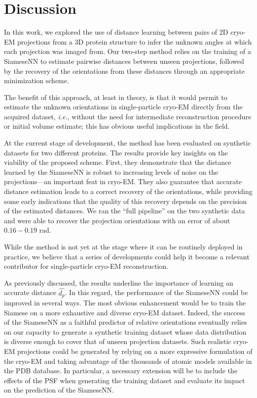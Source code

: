 \section{Discussion}
\label{sec:discussion}

 In this work, we explored the use of distance learning between pairs of 2D cryo-EM projections from a 3D protein structure to infer the unknown angles at which each projection was imaged from. Our two-step method relies on the training of a SiameseNN to estimate pairwise distances between unseen projections, followed by the recovery of the orientations from these distances through an appropriate minimization scheme. 

 The benefit of this approach, at least in theory, is that it would permit to estimate the unknown orientations in single-particle cryo-EM directly from the acquired dataset, \textit{i.e.}, without the need for intermediate reconstruction procedure or initial volume estimate; this has obvious useful implications in the field.  

 At the current stage of development, the method has been evaluated on synthetic datasets for two different proteins. The results provide key insights on the viability of the proposed scheme. First, they demonstrate that the distance learned by the SiameseNN is robust to increasing levels of noise on the projections---an important feat in cryo-EM. They also guarantee that accurate distance estimation leads to a correct recovery of the orientations, while providing some early indications that the quality of this recovery depends on the precision of the estimated distances. We ran the ``full pipeline'' on the two synthetic data and were able to recover the projection orientations with an error of about $0.16-0.19$ rad. 

 While the method is not yet at the stage where it can be routinely deployed in practice, we believe that a series of developments could help it become a relevant contributor for single-particle cryo-EM reconstruction. 

As previously discussed, the results underline the importance of learning an accurate distance $\widehat{d_p}$. In this regard, the performance of the SiameseNN could be improved in several ways. The most obvious enhancement would be to train the Siamese on a more exhaustive and diverse cryo-EM dataset. Indeed, the success of the SiameseNN as a faithful predictor of relative orientations eventually relies on our capacity to generate a synthetic training dataset whose data distribution is diverse enough to cover that of unseen projection datasets. Such realistic cryo-EM projections could be generated by relying on a more expressive formulation of the cryo-EM and taking advantage of the thousands of atomic models available in the PDB database. In particular, a necessary extension will be to include the effects of the PSF when generating the training dataset and evaluate its impact on the prediction of the SiameseNN. 

